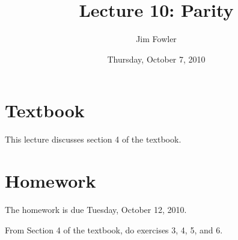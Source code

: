 \documentclass[12pt]{handout}
\title{Lecture 10: Parity}
\author{Jim Fowler}
\date{Thursday, October  7, 2010}
\begin{document}
\maketitle

\section*{Textbook}

This lecture discusses section 4 of the textbook.


\section*{Homework} 





The homework is due Tuesday, October 12, 2010.






From Section 4 of the textbook, do exercises 3, 4, 5, and 6.
\end{document}
